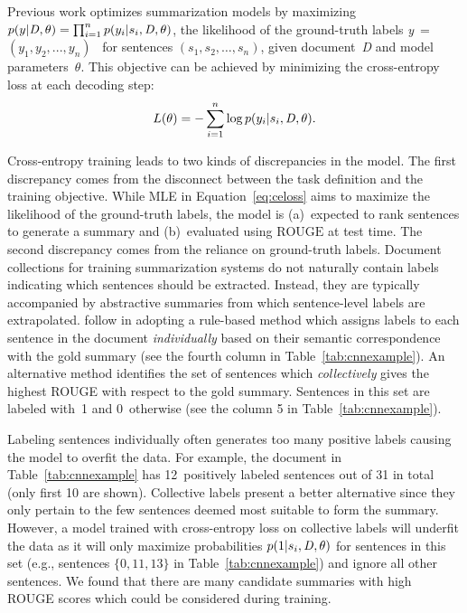 \documentclass[11pt,a4paper]{article}
\newcommand\doc{{\it D }}
\newcommand\labels{{\it y }}
\newcommand\labelseq{{$(y_1, y_2, ..., y_n)$} }
\begin{document}
Previous work 
optimizes summarization
models by maximizing $p(y | \doc,\theta) = \prod_{i=1}^n p(y_i |
s_i,\doc,\theta)$, the likelihood of the ground-truth labels
\mbox{\labels = \labelseq} for sentences $(s_1,s_2,\dots,s_n)$, given
document~\doc and model parameters~$\theta$. This objective can be
achieved by minimizing the cross-entropy loss at each decoding step:
\begin{equation}
  L(\theta) = -\sum_{i=1}^n \log p(y_i | s_i,\doc,\theta). \label{eq:celoss}
\end{equation}

Cross-entropy training leads to two kinds of discrepancies in the
model. The first discrepancy comes from the disconnect between the
task definition and the training objective. While MLE in
Equation~\eqref{eq:celoss} aims to maximize the likelihood of the
ground-truth labels, the model is (a)~expected to rank sentences to
generate a summary and (b)~evaluated using $\mbox{ROUGE}$ at test
time. The second discrepancy comes from the reliance on ground-truth
labels. Document collections for training summarization systems do not
naturally contain labels indicating which sentences should be
extracted. Instead, they are typically accompanied by abstractive
summaries from which sentence-level labels are
extrapolated.  follow  in
adopting a rule-based method which assigns labels to each sentence in
the document \emph{individually} based on their semantic
correspondence with the gold summary (see the fourth column in
Table~\ref{tab:cnnexample}). An alternative method
\cite{svore-emnlp07,Cao:2016,nallapati17} identifies the set of
sentences which \emph{collectively} gives the highest ROUGE with
respect to the gold summary. Sentences in this set are labeled with~1
and 0~otherwise (see the column 5 in Table~\ref{tab:cnnexample}).

Labeling sentences individually often generates too many positive
labels causing the model to overfit the data. For example, the
document in Table~\ref{tab:cnnexample} has 12~positively labeled
sentences out of 31 in total (only first 10 are shown). Collective
labels present a better alternative since they only pertain to the few
sentences deemed most suitable to form the summary. However, a model
trained with cross-entropy loss on collective labels will underfit the
data as it will only maximize probabilities $p(1 | s_i,\doc,\theta)$
for sentences in this set (e.g., sentences $\{0,11,13\}$ in
Table~\ref{tab:cnnexample}) and ignore all other sentences. We found
that there are many candidate summaries with high ROUGE scores which
could be considered during training. 
\end{document}
